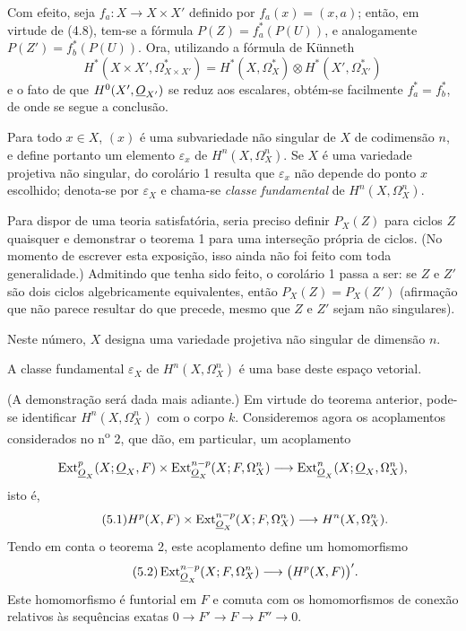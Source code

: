 Com efeito, seja $f_a:X\longrightarrow X\times X'$ definido por
$f_a(x)=(x,a)$; então, em virtude de (4.8), tem-se a fórmula
$P(Z)=f_a^{*}(P(U))$, e analogamente $P(Z')=f_b^{*}(P(U))$. Ora, utilizando a fórmula de
Künneth
\[
  H^{*}(X\times X',\Omega_{X\times X'}^{*})
  =H^{*}(X,\Omega_X^{*})\otimes H^{*}(X',\Omega_{X'}^{*})
\]
e o fato de que $H^{0}(X',\underline{O}_{X'})$ se reduz aos escalares, obtém-se
facilmente $f_a^{*}=f_b^{*}$, de onde se segue a conclusão.

Para todo $x\in X$, $(x)$ é uma subvariedade não singular de $X$ de
codimensão $n$, e define portanto um elemento $\varepsilon_x$ de
$H^{n}(X,\Omega_X^{n})$. Se $X$ é uma variedade projetiva não singular, do
corolário 1 resulta que $\varepsilon_x$ não depende do ponto $x$ escolhido; denota-se
por $\varepsilon_X$ e chama-se \emph{classe fundamental} de
$H^{n}(X,\Omega_X^{n})$.

 Para dispor de uma teoria satisfatória, seria preciso definir
$P_X(Z)$ para ciclos $Z$ quaisquer e demonstrar o teorema 1 para uma
interseção própria de ciclos. (No momento de escrever esta exposição, isso ainda não foi
feito com toda generalidade.) Admitindo que tenha sido feito, o corolário 1
passa a ser: se $Z$ e $Z'$ são dois ciclos algebricamente equivalentes, então
$P_X(Z)=P_X(Z')$ (afirmação que não parece resultar do que precede, mesmo que
$Z$ e $Z'$ sejam não singulares).


Neste número, $X$ designa uma variedade projetiva não singular de dimensão
$n$.

 A classe fundamental $\varepsilon_X$ de
$H^{n}(X,\Omega_X^{n})$ é uma base deste espaço vetorial.

(A demonstração será dada mais adiante.) Em virtude do teorema anterior, pode-se
identificar $H^{n}(X,\Omega_X^{n})$ com o corpo $k$. Consideremos agora os
acoplamentos considerados no n\textsuperscript{o} 2, que dão, em particular, um
acoplamento

\[
\operatorname{Ext}_{\underline{O}_X}^{p}(X;\underline{O}_X,F)
\times\operatorname{Ext}_{\underline{O}_X}^{n-p}(X;F,\Omega_X^{n})
\longrightarrow
\operatorname{Ext}_{\underline{O}_X}^{n}(X;\underline{O}_X,\Omega_X^{n}),
\]
isto é,
\begin{equation}\tag{5.1}
  H^{p}(X,F)
  \times\operatorname{Ext}_{\underline{O}_X}^{n-p}(X;F,\Omega_X^{n})
  \longrightarrow H^{n}(X,\Omega_X^{n}).
\end{equation}
Tendo em conta o teorema 2, este acoplamento define um homomorfismo
\begin{equation}\tag{5.2}
  \operatorname{Ext}_{\underline{O}_X}^{n-p}(X;F,\Omega_X^{n})
  \longrightarrow\bigl(H^{p}(X,F)\bigr)'.
\end{equation}
Este homomorfismo é funtorial em $F$ e comuta com os homomorfismos de conexão
relativos às sequências exatas $0\longrightarrow F'\longrightarrow F
\longrightarrow F''\longrightarrow0$.

